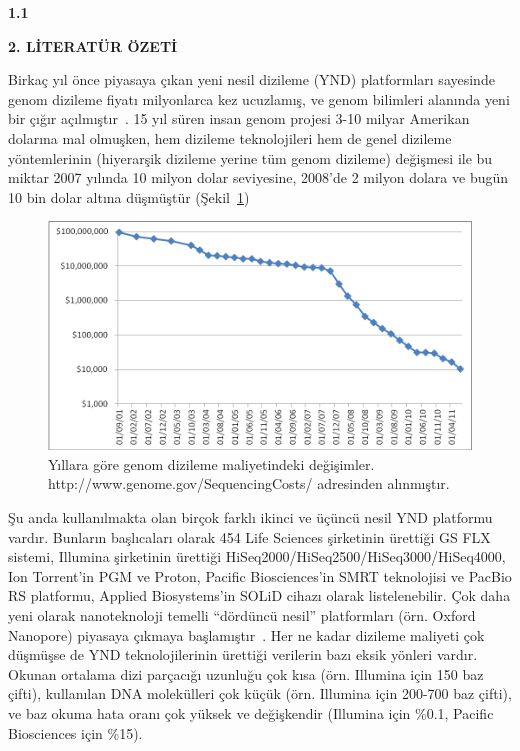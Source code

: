 \documentclass[11pt]{article}
\begin{document}
\bigskip
\noindent
{\bf \large 1.1 }

\noindent

\begin{center}
{\bf \Large 2. LİTERATÜR ÖZETİ}
\end{center}

Birkaç yıl önce piyasaya çıkan yeni nesil dizileme (YND) platformları sayesinde genom dizileme fiyatı milyonlarca kez ucuzlamış, ve genom bilimleri alanında yeni bir çığır açılmıştır~\cite{Mardis2008}. 15 yıl süren insan genom projesi 3-10 milyar Amerikan dolarına mal olmuşken, hem dizileme teknolojileri hem de genel dizileme yöntemlerinin (hiyerarşik dizileme yerine tüm genom dizileme) değişmesi ile bu miktar 2007 yılında 10 milyon dolar seviyesine, 2008'de 2 milyon dolara ve bugün 10 bin dolar altına düşmüştür (Şekil~\ref{fig:cost})

\begin{figure}[htb]
\begin{center}
  \includegraphics[scale=0.75]{cost.png}
\end{center}
\caption{Yıllara göre genom dizileme maliyetindeki değişimler. http://www.genome.gov/SequencingCosts/ adresinden alınmıştır.}
\label{fig:cost}
\end{figure}


Şu anda kullanılmakta olan birçok farklı ikinci ve üçüncü nesil YND platformu vardır. Bunların başlıcaları olarak 454 Life Sciences şirketinin ürettiği GS FLX sistemi, Illumina şirketinin ürettiği HiSeq2000/HiSeq2500/HiSeq3000/HiSeq4000, Ion Torrent'in PGM ve Proton, Pacific Biosciences'in SMRT teknolojisi ve PacBio RS platformu, Applied Biosystems'in SOLiD cihazı olarak listelenebilir. Çok daha yeni olarak nanoteknoloji temelli ``dördüncü nesil'' platformları (örn. Oxford Nanopore) piyasaya çıkmaya başlamıştır~\cite{Metzker2010,Loman2015}. Her ne kadar dizileme maliyeti çok düşmüşse de YND teknolojilerinin ürettiği verilerin bazı eksik yönleri vardır. Okunan ortalama dizi parçacığı uzunluğu çok kısa (örn. Illumina için 150 baz çifti), kullanılan DNA molekülleri çok küçük (örn. Illumina için 200-700 baz çifti), ve baz okuma hata oranı çok yüksek ve değişkendir (Illumina için \%0.1, Pacific Biosciences için \%15).
\end{document}
